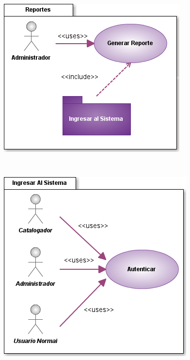 \documentclass[11pt]{article}
\begin{document}
        \begin{minipage}[c]{1\linewidth}
                \centering
                \includegraphics[scale=.7]{casosUso/CUReportes}
        \end{minipage}\\[2cm]
        
        \begin{minipage}[c]{1\linewidth}
                \begin{center}
                \includegraphics[scale=.7]{casosUso/CUAutenticar}                
                \end{center}
        \end{minipage}
        
\end{document}

